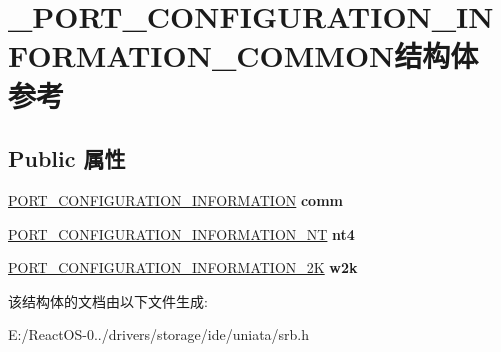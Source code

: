 \hypertarget{struct___p_o_r_t___c_o_n_f_i_g_u_r_a_t_i_o_n___i_n_f_o_r_m_a_t_i_o_n___c_o_m_m_o_n}{}\section{\+\_\+\+P\+O\+R\+T\+\_\+\+C\+O\+N\+F\+I\+G\+U\+R\+A\+T\+I\+O\+N\+\_\+\+I\+N\+F\+O\+R\+M\+A\+T\+I\+O\+N\+\_\+\+C\+O\+M\+M\+O\+N结构体 参考}
\label{struct___p_o_r_t___c_o_n_f_i_g_u_r_a_t_i_o_n___i_n_f_o_r_m_a_t_i_o_n___c_o_m_m_o_n}
\subsection*{Public 属性}
\begin{DoxyCompactItemize}
\item 
\mbox{\label{struct___p_o_r_t___c_o_n_f_i_g_u_r_a_t_i_o_n___i_n_f_o_r_m_a_t_i_o_n___c_o_m_m_o_n_a1db184efd70a3b7b78a90223d9535661}} 
\hyperlink{struct___p_o_r_t___c_o_n_f_i_g_u_r_a_t_i_o_n___i_n_f_o_r_m_a_t_i_o_n}{P\+O\+R\+T\+\_\+\+C\+O\+N\+F\+I\+G\+U\+R\+A\+T\+I\+O\+N\+\_\+\+I\+N\+F\+O\+R\+M\+A\+T\+I\+ON} {\bfseries comm}
\item 
\mbox{\label{struct___p_o_r_t___c_o_n_f_i_g_u_r_a_t_i_o_n___i_n_f_o_r_m_a_t_i_o_n___c_o_m_m_o_n_a79ce44d15e2b9d016df2c03dda67e81a}} 
\hyperlink{struct___p_o_r_t___c_o_n_f_i_g_u_r_a_t_i_o_n___i_n_f_o_r_m_a_t_i_o_n___n_t}{P\+O\+R\+T\+\_\+\+C\+O\+N\+F\+I\+G\+U\+R\+A\+T\+I\+O\+N\+\_\+\+I\+N\+F\+O\+R\+M\+A\+T\+I\+O\+N\+\_\+\+NT} {\bfseries nt4}
\item 
\mbox{\label{struct___p_o_r_t___c_o_n_f_i_g_u_r_a_t_i_o_n___i_n_f_o_r_m_a_t_i_o_n___c_o_m_m_o_n_a52974686de98162d8256076ae3e4aab7}} 
\hyperlink{struct___p_o_r_t___c_o_n_f_i_g_u_r_a_t_i_o_n___i_n_f_o_r_m_a_t_i_o_n__2_k}{P\+O\+R\+T\+\_\+\+C\+O\+N\+F\+I\+G\+U\+R\+A\+T\+I\+O\+N\+\_\+\+I\+N\+F\+O\+R\+M\+A\+T\+I\+O\+N\+\_\+2K} {\bfseries w2k}
\end{DoxyCompactItemize}


该结构体的文档由以下文件生成\+:\begin{DoxyCompactItemize}
\item 
E\+:/\+React\+O\+S-\/0../drivers/storage/ide/uniata/srb.\+h\end{DoxyCompactItemize}
